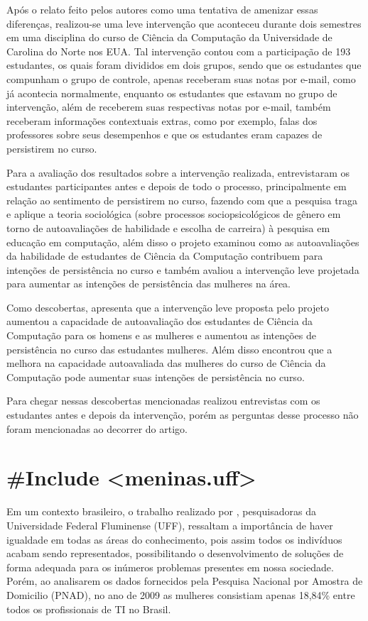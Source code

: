 Após o relato feito pelos autores como uma tentativa de amenizar essas diferenças, realizou-se uma leve intervenção que aconteceu durante dois semestres em uma disciplina do curso de Ciência da Computação da Universidade de Carolina do Norte nos EUA. Tal intervenção contou com a participação de 193 estudantes, os quais foram divididos em dois grupos, sendo que os estudantes que compunham o grupo de controle, apenas receberam suas notas por e-mail, como já acontecia normalmente, enquanto os estudantes que estavam no grupo de intervenção, além de receberem suas respectivas notas por e-mail, também receberam informações contextuais extras, como por exemplo, falas dos professores sobre seus desempenhos e que os estudantes eram capazes de persistirem no curso.

Para a avaliação dos resultados sobre a intervenção realizada,  entrevistaram os estudantes participantes antes e depois de todo o processo, principalmente em relação ao sentimento de persistirem no curso, fazendo com que a pesquisa traga e aplique a teoria sociológica (sobre processos sociopsicológicos de gênero em torno de autoavaliações de habilidade e escolha de carreira) à pesquisa em educação em computação, além disso o projeto examinou como as autoavaliações da habilidade de estudantes de Ciência da Computação contribuem para intenções de persistência no curso e também avaliou a intervenção leve projetada para aumentar as intenções de persistência das mulheres na área.


Como descobertas,  apresenta que a intervenção leve proposta pelo projeto aumentou a capacidade de autoavaliação dos estudantes de Ciência da Computação para os homens e as mulheres e aumentou as intenções de persistência no curso das estudantes mulheres. Além disso encontrou que a melhora na capacidade autoavaliada das mulheres do curso de Ciência da Computação pode aumentar suas intenções de persistência no curso.

Para chegar nessas descobertas mencionadas realizou entrevistas com os estudantes antes e depois da intervenção, porém as perguntas desse processo não foram mencionadas ao decorrer do artigo. 


\section{\#Include <meninas.uff>}\label{sec:meninasuff}
Em um contexto brasileiro, o trabalho realizado por , pesquisadoras da Universidade Federal Fluminense (UFF), ressaltam a importância de haver igualdade em todas as áreas do conhecimento, pois assim todos os indivíduos acabam sendo representados, possibilitando o desenvolvimento de soluções de forma adequada para os inúmeros problemas presentes em nossa sociedade. Porém, ao analisarem os dados fornecidos pela Pesquisa Nacional por Amostra de Domicilio (PNAD), no ano de 2009 as mulheres consistiam apenas 18,84\% entre todos os profissionais de TI no Brasil. 

